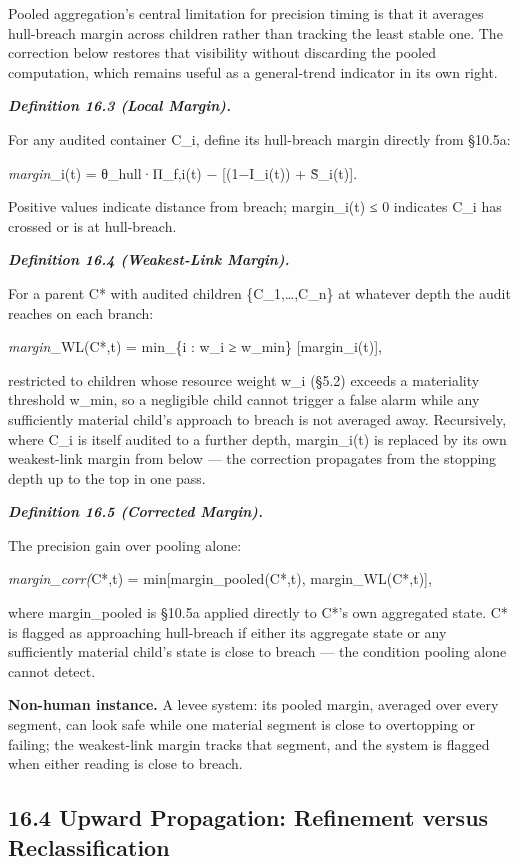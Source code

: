 \documentclass[
]{article}
\begin{document}
Pooled aggregation's central limitation for precision timing is that it
averages hull-breach margin across children rather than tracking the
least stable one. The correction below restores that visibility without
discarding the pooled computation, which remains useful as a
general-trend indicator in its own right.

\emph{\textbf{Definition 16.3 (Local Margin).}}

For any audited container C\_i, define its hull-breach margin directly
from §10.5a:

\emph{margin}\_i(t) = θ\_hull·Π\_f,i(t) − {[}(1−I\_i(t)) + S̃\_i(t){]}.

Positive values indicate distance from breach; margin\_i(t) ≤ 0
indicates C\_i has crossed or is at hull-breach.

\emph{\textbf{Definition 16.4 (Weakest-Link Margin).}}

For a parent C* with audited children \{C\_1,\ldots,C\_n\} at whatever
depth the audit reaches on each branch:

\emph{margin}\_WL(C*,t) = min\_\{i : w\_i ≥ w\_min\} {[}margin\_i(t){]},

restricted to children whose resource weight w\_i (§5.2) exceeds a
materiality threshold w\_min, so a negligible child cannot trigger a
false alarm while any sufficiently material child's approach to breach
is not averaged away. Recursively, where C\_i is itself audited to a
further depth, margin\_i(t) is replaced by its own weakest-link margin
from below --- the correction propagates from the stopping depth up to
the top in one pass.

\emph{\textbf{Definition 16.5 (Corrected Margin).}}

The precision gain over pooling alone:

\emph{margin\_corr(}C*,t) = min{[}margin\_pooled(C*,t),
margin\_WL(C*,t){]},

where margin\_pooled is §10.5a applied directly to C*'s own aggregated
state. C* is flagged as approaching hull-breach if either its aggregate
state or any sufficiently material child's state is close to breach ---
the condition pooling alone cannot detect.

\textbf{Non-human instance.} A levee system: its pooled margin, averaged
over every segment, can look safe while one material segment is close to
overtopping or failing; the weakest-link margin tracks that segment, and
the system is flagged when either reading is close to breach.

\hypertarget{upward-propagation-refinement-versus-reclassification}{%
\subsection{16.4 Upward Propagation: Refinement versus
Reclassification}\label{upward-propagation-refinement-versus-reclassification}}
\end{document}
